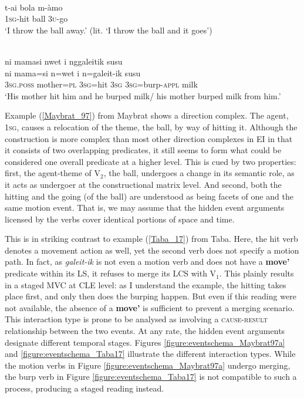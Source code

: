 \ea \label{Maybrat_97} 
\\
\gll t-ai bola m-àmo \\
1\textsc{sg}-hit ball 3\textsc{u}-go \\
\glft `I throw the ball away.' (lit. `I throw the ball and it goes') \\ 
\z

\ea \label{Taba_17}
\\
\glll ni mamasi nwet i nggaleitik susu \\
ni mama=si n=wet i n=galeit-ik susu \\
3\textsc{sg}.\textsc{poss} mother=\textsc{pl} 3\textsc{sg}=hit 3\textsc{sg} 3\textsc{sg}=burp-\textsc{appl} milk\\
\glft `His mother hit him and he burped milk/ his mother burped milk from him.'\\ 
\z

Example (\ref{Maybrat_97}) from Maybrat shows a direction complex. The agent, 1\textsc{sg}, causes a relocation of the theme, the ball, by way of hitting it. Although the construction is more complex than most other direction complexes in EI in that it consists of two overlapping predicates, it still seems to form what could be considered one overall predicate at a higher level. This is cued by two properties: first, the agent-theme of V$_2$, the ball, undergoes a change in its semantic role, as it acts as undergoer at the constructional matrix level. And second, both the hitting and the going (of the ball) are understood as being facets of one and the same motion event. That is, we may assume that the hidden event arguments licensed by the verbs cover identical portions of space and time. 

This is in striking contrast to example (\ref{Taba_17}) from Taba. Here, the hit verb denotes a movement action as well, yet the second verb does not specify a motion path. In fact, as \textit{galeit-ik} is not even a motion verb and does not have a \textbf{move'} predicate within its LS, it refuses to merge its LCS with V$_1$. This plainly results in a staged MVC at CLE level: as I understand the example, the hitting takes place first, and only then does the burping happen. But even if this reading were not available, the absence of a \textbf{move'} is sufficient to prevent a merging scenario. This interaction type is prone to be analysed as involving a \textsc{cause-result} relationship between the two events. At any rate, the hidden event arguments designate different temporal stages. Figures \ref{figure:eventschema_Maybrat97a} and \ref{figure:eventschema_Taba17} illustrate the different interaction types. While the motion verbs in Figure \ref{figure:eventschema_Maybrat97a} undergo merging, the burp verb in Figure \ref{figure:eventschema_Taba17} is not compatible to such a process, producing a staged reading instead.

